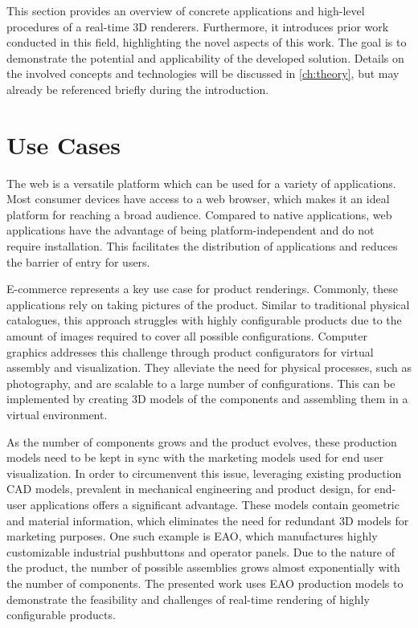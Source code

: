 
This section provides an overview of concrete applications and high-level procedures of a real-time 3D renderers. Furthermore, it introduces prior work conducted in this field, highlighting the novel aspects of this work. The goal is to demonstrate the potential and applicability of the developed solution. Details on the involved concepts and technologies will be discussed in \autoref{ch:theory}, but may already be referenced briefly during the introduction.

\section{Use Cases}

The web is a versatile platform which can be used for a variety of applications. Most consumer devices have access to a web browser, which makes it an ideal platform for reaching a broad audience. Compared to native applications, web applications have the advantage of being platform-independent and do not require installation. This facilitates the distribution of applications and reduces the barrier of entry for users.

E-commerce represents a key use case for product renderings. Commonly, these applications rely on taking pictures of the product. Similar to traditional physical catalogues, this approach struggles with highly configurable products due to the amount of images required to cover all possible configurations. Computer graphics addresses this challenge through product configurators for virtual assembly and visualization. They alleviate the need for physical processes, such as photography, and are scalable to a large number of configurations. This can be implemented by creating 3D models of the components and assembling them in a virtual environment.

As the number of components grows and the product evolves, these production models need to be kept in sync with the marketing models used for end user visualization. In order to circumenvent this issue, leveraging existing production \gls{CAD} models, prevalent in mechanical engineering and product design, for end-user applications offers a significant advantage. These models contain geometric and material information, which eliminates the need for redundant 3D models for marketing purposes. One such example is EAO, which manufactures highly customizable industrial pushbuttons and operator panels. Due to the nature of the product, the number of possible assemblies grows almost exponentially with the number of components. The presented work uses EAO production models to demonstrate the feasibility and challenges of real-time rendering of highly configurable products.

